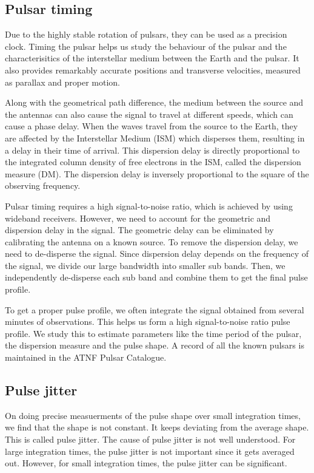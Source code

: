 \documentclass{article_saj}
\begin{document}
\subsection{Pulsar timing}
Due to the highly stable rotation of pulsars, they can be used as a precision clock. Timing the pulsar helps us study the behaviour of the pulsar and the characterisitics of the interstellar medium between the Earth and the pulsar. It also provides remarkably accurate positions and transverse velocities, measured as parallax and proper motion. 

Along with the geometrical path difference, the medium between the source and the antennas can also cause the signal to travel at different speeds, which can cause a phase delay. When the waves travel from the source to the Earth, they are affected by the Interstellar Medium (ISM) which disperses them, resulting in a delay in their time of arrival. This dispersion delay is directly proportional to the integrated column density of free electrons in the ISM, called the dispersion measure (DM). The dispersion delay is inversely proportional to the square of the observing frequency.

Pulsar timing requires a high signal-to-noise ratio, which is achieved by using wideband receivers. However, we need to account for the geometric and dispersion delay in the signal. The geometric delay can be eliminated by calibrating the antenna on a known source. To remove the dispersion delay, we need to de-disperse the signal. Since dispersion delay depends on the frequency of the signal, we divide our large bandwidth into smaller sub bands. Then, we independently de-disperse each sub band and combine them to get the final pulse profile.

To get a proper pulse profile, we often integrate the signal obtained from several minutes of observations. This helps us form a high signal-to-noise ratio pulse profile. We study this to estimate parameters like the time period of the pulsar, the dispersion measure and the pulse shape. A record of all the known pulsars is maintained in the ATNF Pulsar Catalogue.

\subsection{Pulse jitter}
On doing precise measuerments of the pulse shape over small integration times, we find that the shape is not constant. It keeps deviating from the average shape. This is called pulse jitter. The cause of pulse jitter is not well understood. For large integration times, the pulse jitter is not important since it gets averaged out. However, for small integration times, the pulse jitter can be significant.
\end{document}
